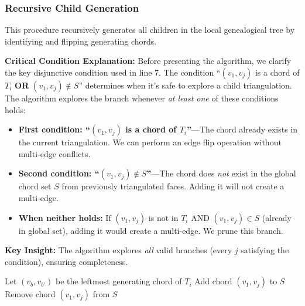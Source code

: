 \documentclass[12pt,a4paper]{article}
\theoremstyle{definition}
\theoremstyle{remark}
\begin{document}
\subsubsection{Recursive Child Generation}

This procedure recursively generates all children in the local genealogical tree by identifying and flipping generating chords.

\textbf{Critical Condition Explanation:} Before presenting the algorithm, we clarify the key disjunctive condition used in line 7. The condition ``$(v_1, v_j)$ is a chord of $T_i$ \textbf{OR} $(v_1, v_j) \notin S$'' determines when it's safe to explore a child triangulation. The algorithm explores the branch whenever \emph{at least one} of these conditions holds:

\begin{itemize}
    \item \textbf{First condition: ``$(v_1, v_j)$ is a chord of $T_i$''}---The chord already exists in the current triangulation. We can perform an edge flip operation without multi-edge conflicts.
    
    \item \textbf{Second condition: ``$(v_1, v_j) \notin S$''}---The chord does \emph{not} exist in the global chord set $S$ from previously triangulated faces. Adding it will not create a multi-edge.
    
    \item \textbf{When neither holds:} If $(v_1, v_j)$ is not in $T_i$ AND $(v_1, v_j) \in S$ (already in global set), adding it would create a multi-edge. We prune this branch.
\end{itemize}

\textbf{Key Insight:} The algorithm explores \emph{all} valid branches (every $j$ satisfying the condition), ensuring completeness.

\begin{algorithm}
\caption{Find All Child Triangulations in Local Tree}
\label{alg:child_triangulations}
\begin{algorithmic}[1]
    \State {}
        \State \Return {}
    \EndIf
    \State Let $(v_b, v_{b'})$ be the leftmost generating chord of $T_i$
            \State Add chord $(v_1, v_j)$ to $S$
            \State {}
            \State Remove chord $(v_1, v_j)$ from $S$
        \EndIf
    \EndFor
\EndProcedure
\end{algorithmic}
\end{algorithm}
\end{document}
